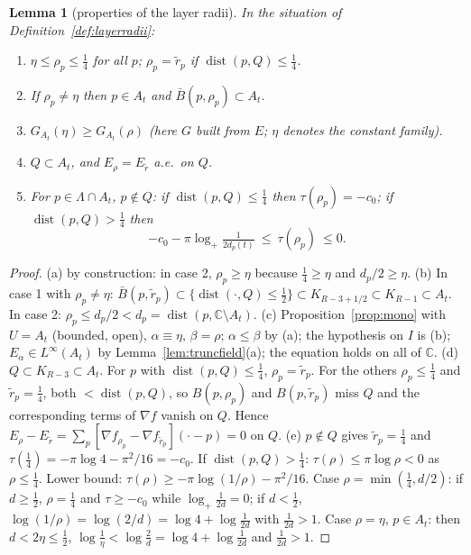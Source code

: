 \documentclass[11pt]{article}
\newtheorem{lemma}[theorem]{Lemma}
\theoremstyle{definition}
\theoremstyle{remark}
\newcommand{\C}{\mathbb C}
\newcommand{\Lam}{\Lambda}
\newcommand{\logp}{\log_+}
\DeclareMathOperator{\dist}{dist}
\begin{document}
\begin{lemma}[properties of the layer radii]\label{lem:layerradii}
In the situation of Definition~\ref{def:layerradii}:
\begin{enumerate}[label=(\alph*)]
\item $\eta\le\rho_p\le\frac14$ for all $p$; $\rho_p=\tilde r_p$ if $\dist(p,Q)\le\frac14$.
\item If $\rho_p\ne\eta$ then $p\in A_t$ and $\bar B(p,\rho_p)\subset A_t$.
\item $G_{A_t}(\eta)\ge G_{A_t}(\rho)$ (here $G$ built from $E$; $\eta$ denotes the constant family).
\item $Q\subset A_t$, and $E_\rho=E_{\tilde r}$ a.e.\ on $Q$.
\item For $p\in\Lam\cap A_t$, $p\notin Q$: if $\dist(p,Q)\le\frac14$ then $\tau(\rho_p)=-c_0$; if $\dist(p,Q)>\frac14$ then
\[
-c_0-\pi\logp\tfrac1{2d_p(t)}\ \le\ \tau(\rho_p)\ \le 0 .
\]
\end{enumerate}
\end{lemma}
\begin{proof}
(a) by construction: in case 2, $\rho_p\ge\eta$ because $\frac14\ge\eta$ and $d_p/2\ge\eta$.
(b) In case 1 with $\rho_p\ne\eta$: $\bar B(p,\tilde r_p)\subset\{\dist(\cdot,Q)\le\frac12\}\subset K_{R-3+1/2}\subset K_{R-1}\subset A_t$.  In case 2: $\rho_p\le d_p/2<d_p=\dist(p,\C\setminus A_t)$.
(c) Proposition~\ref{prop:mono} with $U=A_t$ (bounded, open), $\alpha\equiv\eta$, $\beta=\rho$; $\alpha\le\beta$ by (a); the hypothesis on $I$ is (b); $E_\alpha\in L^\infty(A_t)$ by Lemma~\ref{lem:truncfield}(a); the equation holds on all of $\C$.
(d) $Q\subset K_{R-3}\subset A_t$.  For $p$ with $\dist(p,Q)\le\frac14$, $\rho_p=\tilde r_p$.  For the others $\rho_p\le\frac14$ and $\tilde r_p=\frac14$, both $<\dist(p,Q)$, so $B(p,\rho_p)$ and $B(p,\tilde r_p)$ miss $Q$ and the corresponding terms of $\nabla f$ vanish on $Q$.  Hence $E_\rho-E_{\tilde r}=\sum_p[\nabla f_{\rho_p}-\nabla f_{\tilde r_p}](\cdot-p)=0$ on $Q$.
(e) $p\notin Q$ gives $\tilde r_p=\frac14$ and $\tau(\frac14)=-\pi\log4-\pi^2/16=-c_0$.  If $\dist(p,Q)>\frac14$: $\tau(\rho)\le\pi\log\rho<0$ as $\rho\le\frac14$.
Lower bound: $\tau(\rho)\ge-\pi\log(1/\rho)-\pi^2/16$.  Case $\rho=\min(\frac14,d/2)$: if $d\ge\frac12$, $\rho=\frac14$ and $\tau\ge-c_0$ while $\logp\frac1{2d}=0$; if $d<\frac12$, $\log(1/\rho)=\log(2/d)=\log4+\log\frac1{2d}$ with $\frac1{2d}>1$.  Case $\rho=\eta$, $p\in A_t$: then $d<2\eta\le\frac12$, $\log\frac1\eta<\log\frac2d=\log4+\log\frac1{2d}$ and $\frac1{2d}>1$.
\end{proof}
\end{document}
